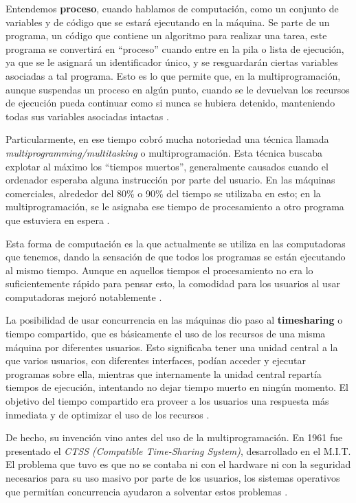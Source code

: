 \documentclass[letterpaper,12pt,oneside]{book}
\begin{document}
        Entendemos \textbf{proceso}, cuando hablamos de computación, como un conjunto de variables y de código que
		se estará ejecutando en la máquina. Se parte de un programa, un código que contiene un algoritmo para realizar una tarea, este programa se convertirá en ``proceso'' cuando entre en la pila o lista de ejecución, ya que se le asignará un identificador único,
		y se resguardarán ciertas variables asociadas a tal programa. Esto es lo que permite que, en la multiprogramación,  aunque suspendas un proceso en algún punto,
		cuando se le devuelvan los recursos de ejecución pueda continuar como si nunca se hubiera detenido, manteniendo todas sus variables asociadas intactas \cite{tanenbaum_modern_2002}.
		
		
		Particularmente, en ese tiempo cobró mucha notoriedad una técnica llamada \textit{multiprogramming/multitasking} o multiprogramación.
		Esta técnica buscaba explotar al máximo los ``tiempos muertos'', generalmente causados cuando el ordenador esperaba alguna instrucción por
		parte del usuario. En las máquinas comerciales, alrededor del 80\% o 90\% del tiempo se utilizaba en esto; en  la multiprogramación, se le 
		asignaba ese tiempo
		de procesamiento a otro programa que estuviera en espera \cite{tanenbaum_modern_2002}.
  
        Esta forma de computación es la que actualmente se utiliza en las computadoras que tenemos, dando
		la sensación de que todos los programas  se  están ejecutando al mismo tiempo. Aunque en aquellos tiempos el procesamiento no era
		lo suficientemente rápido para pensar esto, la comodidad para los usuarios al usar computadoras mejoró notablemente \cite{tanenbaum_modern_2002}.
		
		
		La posibilidad de usar concurrencia en las máquinas dio paso al \textbf{timesharing} o tiempo compartido, que es básicamente el uso de los 
		recursos de una misma máquina por diferentes usuarios. Esto significaba tener una unidad central a la que varios usuarios, con diferentes interfaces, podían acceder y ejecutar programas
        sobre ella, mientras que internamente la unidad central repartía tiempos de ejecución, intentando no dejar tiempo muerto en ningún momento. 
        El objetivo del tiempo compartido era proveer a los usuarios una respuesta más inmediata y de optimizar el uso de los recursos \cite{tanenbaum_modern_2002}.
     
	    De hecho, su invención vino antes del uso de la multiprogramación. En 1961 fue presentado el \textit{CTSS (Compatible Time-Sharing System)}, desarrollado
	    en el M.I.T. El problema que tuvo es que no se contaba ni con el hardware ni con la seguridad necesarios para su uso masivo por parte de los usuarios,
		los sistemas operativos que permitían concurrencia ayudaron a solventar estos problemas \cite{tanenbaum_modern_2002}.
     
\end{document}
